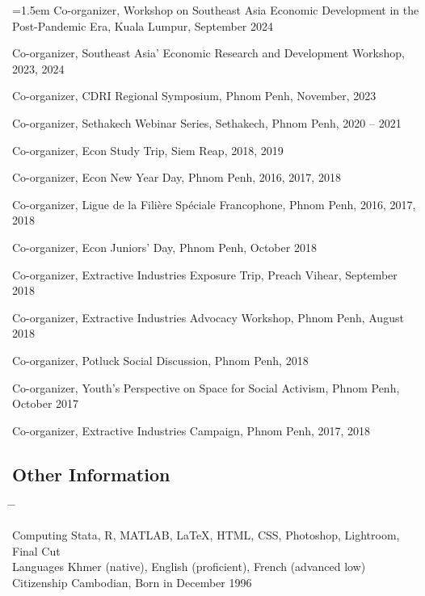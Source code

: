 \documentclass[10pt,a4paper]{article}
\newcommand{\tabbedblock}[1]{

	\begin{tabbing}
		\hspace{2cm} \= \hspace{4cm} \= \kill
		#1
	\end{tabbing}
}
\begin{document}
	\hangindent=1.5em
	Co-organizer, Workshop on Southeast Asia Economic Development in the Post-Pandemic Era, Kuala Lumpur, September 2024

	Co-organizer, Southeast Asia' Economic Research and Development Workshop, 2023, 2024
	
	Co-organizer, CDRI Regional Symposium, Phnom Penh, November, 2023
	
	Co-organizer, Sethakech Webinar Series, Sethakech, Phnom Penh, 2020 -- 2021

	Co-organizer, Econ Study Trip, Siem Reap, 2018, 2019

	Co-organizer, Econ New Year Day, Phnom Penh, 2016, 2017, 2018

	Co-organizer, Ligue de la Filière Spéciale Francophone, Phnom Penh, 2016, 2017, 2018
		
	Co-organizer, Econ Juniors' Day, Phnom Penh, October 2018
		
	Co-organizer, Extractive Industries Exposure Trip, Preach Vihear, September 2018

	Co-organizer, Extractive Industries Advocacy Workshop, Phnom Penh, August 2018
		
	Co-organizer, Potluck Social Discussion, Phnom Penh, 2018
			
	Co-organizer, Youth's Perspective on Space for Social Activism, Phnom Penh, October 2017
		
	Co-organizer, Extractive Industries Campaign, Phnom Penh, 2017, 2018

\subsection*{Other Information}

\tabbedblock{
	Computing \> Stata, R, MATLAB, \LaTeX, HTML, CSS, Photoshop, Lightroom, Final Cut\\
	
	Languages \> Khmer (native), English (proficient), French (advanced low)\\
	
	Citizenship \> Cambodian, Born in December 1996
}


\end{document}
